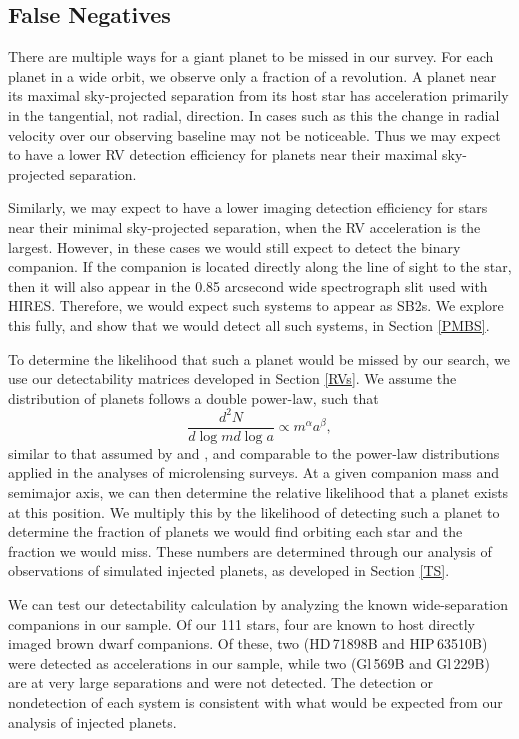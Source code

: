 \subsection{False Negatives}
\label{FN}

There are multiple ways for a giant planet to be missed in our survey. For each planet in a wide orbit, we observe only a fraction of a revolution. A planet near its maximal sky-projected separation from its host star has acceleration primarily in the tangential, not radial, direction. In cases such as this the change in radial velocity over our observing baseline may not be noticeable. Thus we may expect to have a lower RV detection efficiency for planets near their maximal sky-projected separation. 

Similarly, we may expect to have a lower imaging detection efficiency for stars near their minimal sky-projected separation, when the RV acceleration is the largest. However, in these cases we would still expect to detect the binary companion. If the companion is located directly along the line of sight to the star, then it will also appear in the 0.85 arcsecond wide spectrograph slit used with HIRES. Therefore, we would expect such systems to appear as SB2s. We explore this fully, and show that we would detect all such systems, in Section \ref{PMBS}.

To determine the likelihood that such a planet would be missed by our search, we use our detectability matrices developed in Section \ref{RVs}. We assume the distribution of planets follows a double power-law, such that
\begin{equation}
\frac{d^2N}{d\log m d\log a} \propto m^{\alpha} a^{\beta},
\label{DPL}
\end{equation}
similar to that assumed by \citet{Cumming08} and \citet{Bowler10}, and comparable to the power-law distributions applied in the analyses of microlensing surveys. At a given companion mass and semimajor axis, we can then determine the relative likelihood that a planet exists at this position. We multiply this by the likelihood of detecting such a planet to determine the fraction of planets we would find orbiting each star and the fraction we would miss. These numbers are determined through our analysis of observations of simulated injected planets, as developed in Section \ref{TS}.

We can test our detectability calculation by analyzing the known wide-separation companions in our sample. Of our 111 stars, four are known to host directly imaged brown dwarf companions. Of these, two (HD\,71898B and HIP\,63510B) were detected as accelerations in our sample, while two (Gl\,569B and Gl\,229B) are at very large separations and were not detected. The detection or nondetection of each system is consistent with what would be expected from our analysis of injected planets.



